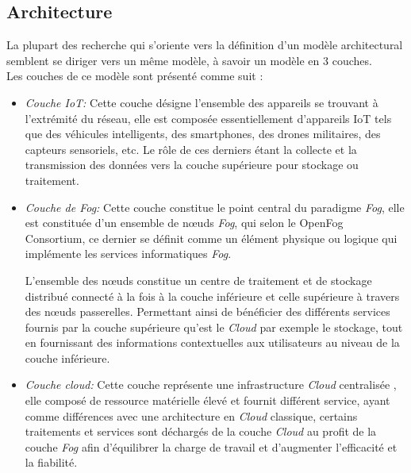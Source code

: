 \subsection{Architecture}
La plupart des recherche qui s'oriente vers la définition d'un modèle architectural semblent se diriger vers un même modèle, à savoir un modèle en 3 couches\cite{de2019}.\\
Les couches de ce modèle sont présenté comme suit :
\begin{itemize}
  \item \emph{Couche IoT:} Cette couche désigne l'ensemble des appareils se trouvant à l'extrémité du réseau, elle est composée essentiellement d'appareils IoT tels que des véhicules intelligents, des smartphones, des drones militaires, des capteurs sensoriels, etc. Le rôle de ces derniers étant la collecte et la transmission des données vers la couche supérieure pour stockage ou traitement.
  \item \emph{Couche de Fog:} Cette couche constitue le point central du paradigme \emph{Fog}, elle est constituée d'un ensemble de nœuds \emph{Fog}, qui selon le OpenFog Consortium, ce dernier se définit comme 
  \og{}un élément physique ou logique qui implémente les services informatiques \emph{Fog}\fg\cite{de2019}.\par
  L'ensemble des nœuds constitue un centre de traitement et de stockage distribué connecté à la fois à la couche inférieure et celle supérieure à travers des nœuds passerelles. Permettant ainsi de bénéficier des différents services fournis par la couche supérieure qu'est le \emph{Cloud} par exemple le stockage, tout en fournissant des informations contextuelles aux utilisateurs au niveau de la couche inférieure.
  \item \emph{Couche cloud:} Cette couche représente une infrastructure \emph{Cloud} centralisée , elle composé de ressource matérielle élevé et fournit différent service, ayant comme différences avec une architecture en \emph{Cloud} classique, certains traitements et services sont déchargés de la couche \emph{Cloud} au profit de la couche \emph{Fog} afin d'équilibrer la charge de travail et d'augmenter l'efficacité et la fiabilité.
\end{itemize}
